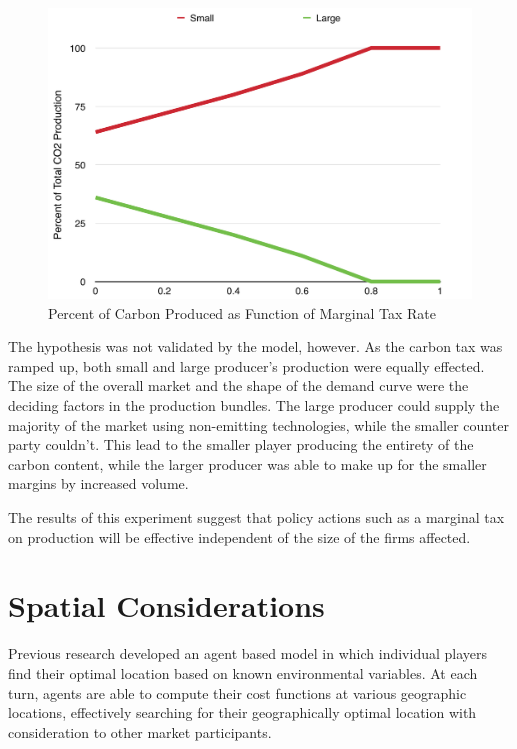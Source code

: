 \documentclass[12pt]{article}
\begin{document}
\begin{figure}[ht!]
	\begin{center}
	\includegraphics[scale=.4]{CO2_percent.png}
	\caption{Percent of Carbon Produced as Function of Marginal Tax Rate}
	\label{co2percent}
	\end{center}
\end{figure}

The hypothesis was not validated by the model, however. As the carbon tax was ramped up, both small and large producer's production were equally effected. The size of the overall market and the shape of the demand curve were the deciding factors in the production bundles. The large producer could supply the majority of the market using non-emitting technologies, while the smaller counter party couldn't. This lead to the smaller player producing the entirety of the carbon content, while the larger producer was able to make up for the smaller margins by increased volume. 

The results of this experiment suggest that policy actions such as a marginal tax on production will be effective independent of the size of the firms affected. 


\section{Spatial Considerations}

Previous research developed an agent based model in which individual players find their optimal location based on known environmental variables. At each turn, agents are able to compute their cost functions at various geographic locations, effectively searching for their geographically optimal location with consideration to other market participants. 
\end{document}
